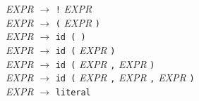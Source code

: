 \documentclass[12pt,a4paper,titlepage,final]{article}
\begin{document}
 \textit{EXPR} $\rightarrow$ \texttt{!} \textit{EXPR} \\
 \textit{EXPR} $\rightarrow$ \texttt{(} \textit{EXPR} \texttt{)} \\
 \textit{EXPR} $\rightarrow$ \texttt{id ( )} \\
 \textit{EXPR} $\rightarrow$ \texttt{id (} \textit{EXPR} \texttt{)}  \\
 \textit{EXPR} $\rightarrow$ \texttt{id (} \textit{EXPR} \texttt{,} \textit{EXPR} \texttt{)} \\
 \textit{EXPR} $\rightarrow$ \texttt{id (} \textit{EXPR} \texttt{,} \textit{EXPR} \texttt{,} \textit{EXPR} \texttt{)} \\
 \textit{EXPR} $\rightarrow$ \texttt{literal} \\
\newpage

\end{document}
